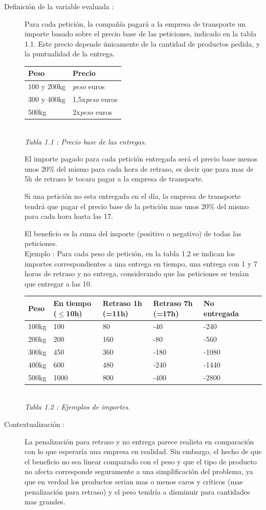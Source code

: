 \documentclass{article}
\begin{document}
\begin{description}
\item[Definición de la variable evaluada :]
Para cada petición, la compañía pagará a la empresa de transporte un importe
basado sobre el precio base de las peticiones, indicado en la tabla 1.1. Este
precio depende únicamente de la cantidad de productos pedida, y la puntualidad
de la entrega.
\begin{center}
\begin{tabular}{|l|l|}
\hline
Peso & Precio\\
\hline
100 y 200kg & {\it peso} euros\\
300 y 400kg & 1,5x{\it peso} euros\\
500kg & 2x{\it peso} euros\\
\hline
\end{tabular}\\
{\it Tabla 1.1 : Precio base de las entregas.}
\end{center}

El importe pagado para cada petición entregada será el precio base menos unos
20\% del mismo para cada hora de retraso, es decir que para mas de 5h de retraso
le tocara pagar a la empresa de transporte.

Si una petición no esta entregada en el día, la empresa de transporte tendrá que
pagar el precio base de la petición mas unos 20\% del mismo para cada hora hasta
las 17.

El beneficio es la suma del importe (positivo o negativo) de todas las
peticiones.\\

Ejemplo : Para cada peso de petición, en la tabla 1.2 se indican los
importes correspondientes a una entrega en tiempo, una entrega con 1 y 7 horas
de retraso y no entrega, considerando que las peticiones se tenían que entregar
a las 10.
\begin{center}
\begin{tabular}{|l|l|l|l|l|l|l|}
\hline
Peso & En tiempo ($\leq$10h) & Retraso 1h (=11h) & Retraso 7h (=17h) & No
entregada\\
\hline
100kg & 100 & 80 & -40 & -240\\
200kg & 200 & 160 & -80 & -560\\
300kg & 450 & 360 & -180 & -1080\\
400kg & 600 & 480 & -240 & -1440\\
500kg & 1000 & 800 & -400 & -2800\\
\hline
\end{tabular}\\
{\it Tabla 1.2 : Ejemplos de importes.} \end{center}

\item[Contextualización :] La penalización para retraso y no entrega parece
realista en comparación con lo que esperaría una empresa en realidad. Sin
embargo, el hecho de que el beneficio no sea linear comparado con el peso y que
el tipo de producto no afecta corresponde seguramente a una simplificación del
problema, ya que en verdad los productos serian mas o menos caros y críticos
(mas penalización para retraso) y el peso tendría a disminuir para cantidades
mas grandes.
\end{description}
\end{document}
